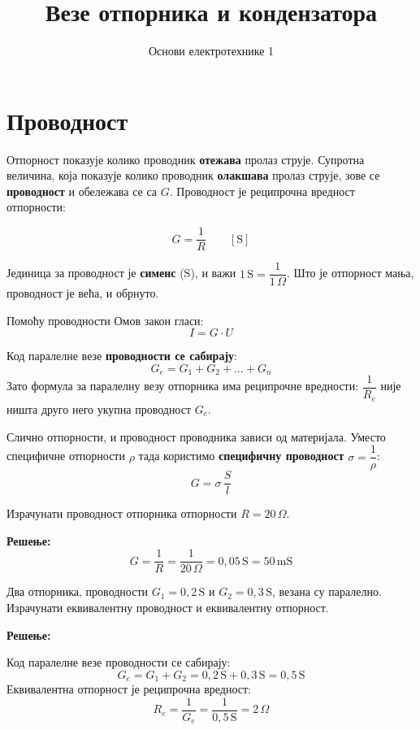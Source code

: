 \documentclass[12pt]{article}
\title{Везе отпорника и кондензатора}
\author{Основи електротехнике 1}
\date{}
\begin{document}
\maketitle
\section{Проводност}

Отпорност показује колико проводник \textbf{отежава} пролаз струје. Супротна
величина, која показује колико проводник \textbf{олакшава} пролаз струје,
зове се \textbf{проводност} и обележава се са $G$. Проводност је реципрочна
вредност отпорности:

\begin{kljucno}
\[
G = \frac{1}{R} \qquad [\text{S}]
\]
\end{kljucno}

Јединица за проводност је \textbf{сименс} (S), и важи
$1\,\text{S} = \dfrac{1}{1\,\Omega}$. Што је отпорност мања, проводност је
већа, и обрнуто.

Помоћу проводности Омов закон гласи:
\[
I = G \cdot U
\]

Код паралелне везе \textbf{проводности се сабирају}:
\[
G_e = G_1 + G_2 + \dots + G_n
\]
Зато формула за паралелну везу отпорника има реципрочне вредности:
$\dfrac{1}{R_e}$ није ништа друго него укупна проводност $G_e$.

Слично отпорности, и проводност проводника зависи од материјала. Уместо
специфичне отпорности $\rho$ тада користимо \textbf{специфичну проводност}
$\sigma = \dfrac{1}{\rho}$:
\[
G = \sigma \, \frac{S}{l}
\]

\begin{primer}
Израчунати проводност отпорника отпорности $R = 20\,\Omega$.

\textbf{Решење:}
\[
G = \frac{1}{R} = \frac{1}{20\,\Omega} = 0{,}05\,\text{S} = 50\,\text{mS}
\]
\end{primer}

\begin{primer}
Два отпорника, проводности $G_1 = 0{,}2\,\text{S}$ и $G_2 = 0{,}3\,\text{S}$,
везана су паралелно. Израчунати еквивалентну проводност и еквивалентну
отпорност.

\textbf{Решење:}

Код паралелне везе проводности се сабирају:
\[
G_e = G_1 + G_2 = 0{,}2\,\text{S} + 0{,}3\,\text{S} = 0{,}5\,\text{S}
\]
Еквивалентна отпорност је реципрочна вредност:
\[
R_e = \frac{1}{G_e} = \frac{1}{0{,}5\,\text{S}} = 2\,\Omega
\]
\end{primer}
\end{document}
